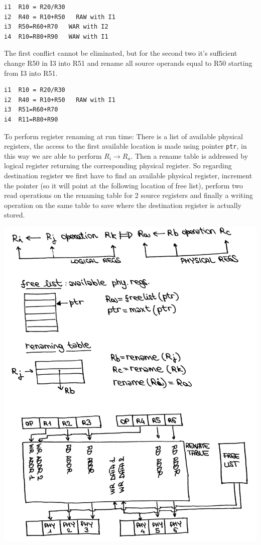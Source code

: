 \begin{verbatim}
i1  R10 = R20/R30
i2  R40 = R10+R50   RAW with I1
i3  R50=R60+R70   WAR with I2
i4  R10=R80+R90   WAW with I1
\end{verbatim}

The first conflict cannot be eliminated, but for the second two it's sufficient change R50 in I3 into R51 and rename all source operands equal to R50 starting from I3 into R51.

\begin{verbatim}
i1  R10 = R20/R30
i2  R40 = R10+R50   RAW with I1
i3  R51=R60+R70
i4  R11=R80+R90
\end{verbatim}

To perform register renaming at run time:
There is a list of available physical registers, the access to the first available location is made using pointer \verb|ptr|, in this way we are able to perform $R_i \rightarrow R_a$.
Then a rename table is addressed by logical register returning the corresponding physical register. So regarding destination register we first have to find an available physical register, increment the pointer (so it will point at the following location of free list), perform two read operations on the renaming table for 2 source registers and finally a writing operation on the same table to save where the destination register is actually stored.

\begin{center}
  \includegraphics[width=1.0\linewidth]{img/img3/26}
\end{center}



